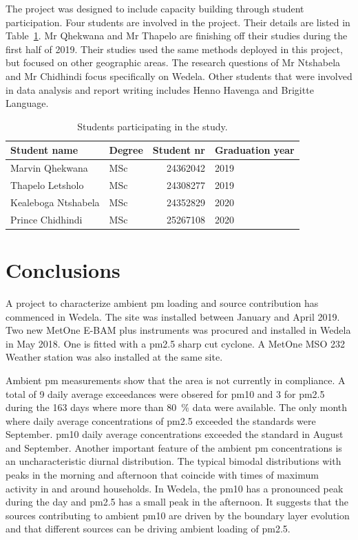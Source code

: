 \documentclass{nwureport}
\begin{document}
The project was designed to include capacity building through student participation. Four students are involved in the project. Their details are listed in Table~\ref{table:capacity}. Mr Qhekwana and Mr Thapelo are finishing off their studies during the first half of 2019. Their studies used the same methods deployed in this project, but focused on other geographic areas. The research questions of Mr Ntshabela and Mr Chidhindi focus specifically on Wedela. Other students that were involved in data analysis and report writing includes Henno Havenga and Brigitte Language.

\begin{table}[!htbp]
\label{table:capacity}
\caption{Students participating in the study.}
\begin{center}
  \begin{tabular}{l l r l}
    \toprule
    \bfseries{Student name} & \bfseries{Degree} & \bfseries{Student nr} & \bfseries{Graduation year} \\
    \midrule
    Marvin Qhekwana & MSc & 24362042 & 2019 \\
    Thapelo Letsholo & MSc & 24308277 & 2019 \\
    Kealeboga Ntshabela & MSc & 24352829 & 2020 \\
    Prince Chidhindi & MSc & 25267108 & 2020 \\ 
    \bottomrule
  \end{tabular}
\end{center}
\end{table}
\chapter{Conclusions}
\label{sec:conclusions}

A project to characterize ambient \gls{pm} loading and source contribution has commenced in Wedela. The site was installed between January and April 2019. Two new MetOne E-BAM plus instruments was procured and installed in Wedela in May 2018. One is fitted with a \gls{pm2.5} sharp cut cyclone. A MetOne MSO 232 Weather station was also installed at the same site. 

Ambient \gls{pm} measurements show that the area is not currently in compliance. A total of 9 daily average exceedances were obsered for \gls{pm10} and 3 for \gls{pm2.5} during the 163 days where more than \SI{80}{\percent} data were available. The only month where daily average concentrations of \gls{pm2.5} exceeded the standards were September. \gls{pm10} daily average concentrations exceeded the standard in August and September. Another important feature of the ambient \gls{pm} concentrations is an uncharacteristic diurnal distribution. The typical bimodal distributions with peaks in the morning and afternoon that coincide with times of maximum activity in and around households. In Wedela, the \gls{pm10} has a pronounced peak during the day and \gls{pm2.5} has a small peak in the afternoon. It suggests that the sources contributing to ambient \gls{pm10} are driven by the boundary layer evolution and that different sources can be driving ambient loading of \gls{pm2.5}.
\end{document}
